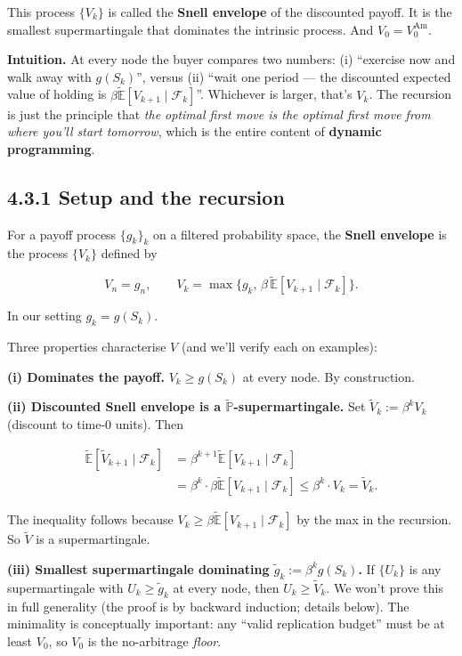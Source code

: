 \documentclass[
  10pt,
  twoside]{book}
\begin{document}
This process \(\{V_k\}\) is called the \textbf{Snell envelope} of the
discounted payoff. It is the smallest supermartingale that dominates the
intrinsic process. And \(V_0 = V_0^{\text{Am}}\).

\textbf{Intuition.} At every node the buyer compares two numbers: (i)
``exercise now and walk away with \(g(S_k)\)'', versus (ii) ``wait one
period --- the discounted expected value of holding is
\(\beta \tilde{\mathbb{E}}[V_{k+1}\mid \mathcal F_k]\)''. Whichever is
larger, that's \(V_k\). The recursion is just the principle that
\emph{the optimal first move is the optimal first move from where you'll
start tomorrow}, which is the entire content of \textbf{dynamic
programming}.

\subsection{4.3.1 Setup and the
recursion}\label{setup-and-the-recursion}

For a payoff process \(\{g_k\}_k\) on a filtered probability space, the
\textbf{Snell envelope} is the process \(\{V_k\}\) defined by

\[V_n = g_n, \qquad V_k = \max\big\{g_k,\, \beta\, \tilde{\mathbb{E}}[V_{k+1}\mid\mathcal F_k]\big\}.\]

In our setting \(g_k = g(S_k)\).

Three properties characterise \(V\) (and we'll verify each on examples):

\textbf{(i) Dominates the payoff.} \(V_k \ge g(S_k)\) at every node. By
construction.

\textbf{(ii) Discounted Snell envelope is a
\(\tilde{\mathbb{P}}\)-supermartingale.} Set
\(\tilde V_k := \beta^k V_k\) (discount to time-0 units). Then

\[\begin{aligned}
\tilde{\mathbb{E}}[\tilde V_{k+1}\mid\mathcal F_k] &= \beta^{k+1}\tilde{\mathbb{E}}[V_{k+1}\mid\mathcal F_k] \\
&= \beta^k\!\cdot\!\beta\!\tilde{\mathbb{E}}[V_{k+1}\mid\mathcal F_k] \le \beta^k\!\cdot V_k = \tilde V_k.
\end{aligned}\]

The inequality follows because
\(V_k \ge \beta\tilde{\mathbb{E}}[V_{k+1}\mid\mathcal F_k]\) by the max
in the recursion. So \(\tilde V\) is a supermartingale.

\textbf{(iii) Smallest supermartingale dominating
\(\tilde g_k := \beta^k g(S_k)\).} If \(\{U_k\}\) is any supermartingale
with \(U_k \ge \tilde g_k\) at every node, then \(U_k \ge \tilde V_k\).
We won't prove this in full generality (the proof is by backward
induction; details below). The minimality is conceptually important: any
``valid replication budget'' must be at least \(V_0\), so \(V_0\) is the
no-arbitrage \emph{floor}.
\end{document}
